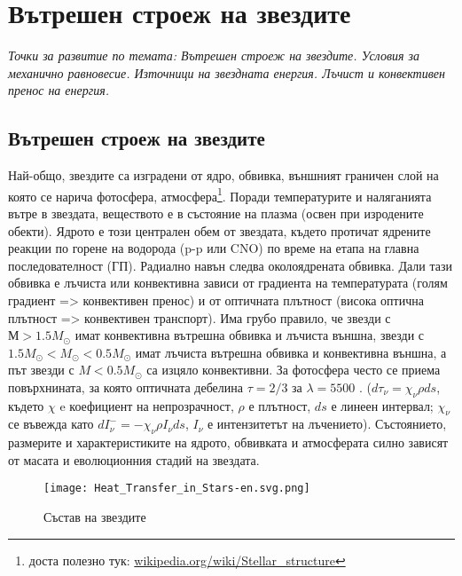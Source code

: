 \documentclass[a4paper,12pt]{article}
\let\oldAA\AA
\renewcommand{\AA}{\text{\normalfont\oldAA}}
\begin{document}
\section{Вътрешен строеж на звездите}

\textit{Точки за развитие по темата: Вътрешен строеж на звездите. Условия за механично равновесие. Източници на звездната енергия. Лъчист и конвективен пренос на енергия.}

\subsection{Вътрешен строеж на звездите}

Най-общо, звездите са изградени от ядро, обвивка, външният граничен слой на която се нарича фотосфера, атмосфера\footnote{доста полезно тук: \url{wikipedia.org/wiki/Stellar_structure}}. Поради температурите и наляганията вътре в звездата, веществото е в състояние на плазма (освен при изродените обекти). Ядрото е този централен обем от звездата, където протичат ядрените реакции по горене на водорода (p-p или CNO) по време на етапа на главна последователност (ГП).  Радиално навън следва околоядрената обвивка. Дали тази обвивка е лъчиста или конвективна зависи от градиента на температурата (голям градиент => конвективен пренос) и от оптичната плътност (висока оптична плътност => конвективен транспорт). Има грубо правило, че звезди с $М>1.5M_{\odot}$ имат конвективна вътрешна обвивка и лъчиста външна, звезди с $1.5M_{\odot}< M_{\odot} < 0.5M_{\odot}$ имат лъчиста вътрешна обвивка и конвективна външна, а път звезди с $M < 0.5M_{\odot}$ са изцяло конвективни. За фотосфера често се приема повърхнината, за която оптичната дебелина $\tau=2/3$  за $\lambda=5500$ \AA. ($d\tau_{\nu}=\chi_{\nu} \rho ds$, където $\chi$ e коефициент на непрозрачност, $\rho$ е плътност, $ds$ е линеен интервал; $\chi_{\nu}$ се въвежда като $dI_{\nu}^{-}=-\chi_{\nu}\rho I_{\nu} ds$, $I_{\nu}$ е интензитетът на лъчението). Състоянието, размерите и характеристиките на ядрото, обвивката и атмосферата силно зависят от масата и еволюционния стадий на звездата.

\begin{figure}[h!]
\centering
\texttt{[image: Heat\_Transfer\_in\_Stars-en.svg.png]}
\caption{Състав на звездите}
\label{fig:Heat_Transfer_in_Stars-en}
\end{figure}
\end{document}
